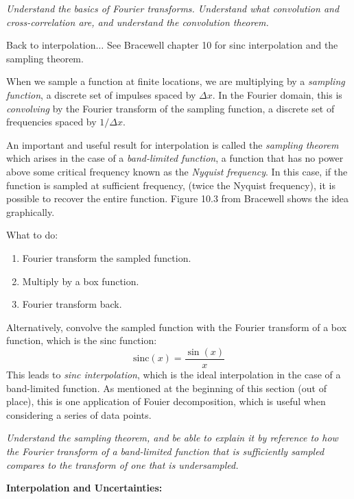 \documentclass{article}
\newcommand{\test}[1]{%
    \begin{center}
        \colorbox{hl}{\parbox{0.9\textwidth}{\emph{\centering #1}}}
    \end{center}}
\begin{document}
\test{Understand the basics of Fourier transforms. Understand what
convolution and cross-correlation are, and understand the convolution
theorem.}

Back to interpolation$\ldots$ See Bracewell chapter 10 for sinc
interpolation and the sampling theorem.

When we sample a function at finite locations, we are multiplying by a
\emph{sampling function}, a discrete set of impulses spaced by
$\Delta{x}$. In the Fourier domain, this is \emph{convolving} by the Fourier
transform of the sampling function, a discrete set of frequencies
spaced by $1/\Delta{x}$.

An important and useful result for interpolation is called the
\emph{sampling theorem} which arises in the case of a \emph{band-limited
function}, a function that has no power above some critical frequency
known as the \emph{Nyquist frequency}. In this case, if the function is
sampled at sufficient frequency, (twice the Nyquist frequency), it is
possible to recover the entire function. Figure 10.3 from Bracewell shows
the idea graphically.

What to do:
\begin{enumerate}
    \item Fourier transform the sampled function.
    \item Multiply by a box function.
    \item Fourier transform back.
\end{enumerate}
Alternatively, convolve
the sampled function with the Fourier transform of a box function,
which is the sinc function:
$$ \textrm{sinc}(x) = \frac{\sin(x)}{x} $$
This leads to \emph{sinc interpolation}, which is the ideal interpolation
in the case of a band-limited function. As mentioned at the beginning of
this section (out of place), this is one application of Fouier
decomposition, which is useful when considering a series of data points.

\test{Understand the sampling theorem, and be able to explain it by
reference to how the Fourier transform of a band-limited function that is
sufficiently sampled compares to the transform of one that is undersampled.}

\textbf{Interpolation and Uncertainties:}
\end{document}
